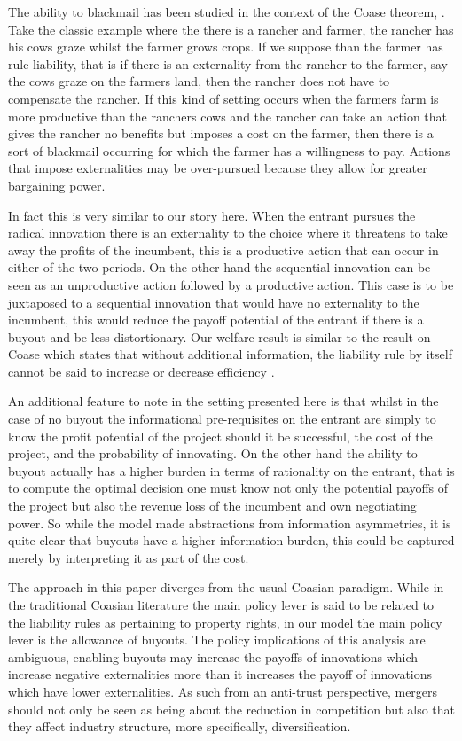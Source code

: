 \documentclass[11pt]{article}
\begin{document}
The ability to blackmail has been studied in the context of the Coase theorem, \cite{Dem}. Take the classic example where the there is a rancher and farmer, the rancher has his cows graze whilst the farmer grows crops. If we suppose than the farmer has rule liability, that is if there is an externality from the rancher to the farmer, say the cows graze on the farmers land, then the rancher does not have to compensate the rancher. If this kind of setting occurs when the farmers farm is more productive than the ranchers cows and the rancher can take an action that gives the rancher no benefits but imposes a cost on the farmer, then there is a sort of blackmail occurring for which the farmer has a willingness to pay. Actions that impose externalities may be over-pursued because they allow for greater bargaining power. 

In fact this is very similar to our story here. When the entrant pursues the radical innovation there is an externality to the choice where it threatens to take away the profits of the incumbent, this is a productive action that can occur in either of the two periods. On the other hand the sequential innovation can be seen as an unproductive action followed by a productive action. This case is to be juxtaposed to a sequential innovation that would have no externality to the incumbent, this would reduce the payoff potential of the entrant if there is a buyout and be less distortionary. Our welfare result is similar to the result on Coase which states that without additional information, the liability rule by itself cannot be said to increase or decrease efficiency \cite{Dem}. 

An additional feature to note in the setting presented here is that whilst in the case of no buyout the informational pre-requisites on the entrant are simply to know the profit potential of the project should it be successful, the cost of the project, and the probability of innovating. On the other hand the ability to buyout actually has a higher burden in terms of rationality on the entrant, that is to compute the optimal decision one must know not only the potential payoffs of the project but also the revenue loss of the incumbent and own negotiating power. So while the model made abstractions from information asymmetries, it is quite clear that buyouts have a higher information burden, this could be captured merely by interpreting it as part of the cost. 

The approach in this paper diverges from the usual Coasian paradigm. While in the traditional Coasian literature the main policy lever is said to be related to the liability rules as pertaining to property rights, in our model the main policy lever is the allowance of buyouts.  The policy implications of this analysis are ambiguous, enabling buyouts may increase the payoffs of innovations which increase negative externalities more than it increases the payoff of innovations which have lower externalities. As such from an anti-trust perspective, mergers should not only be seen as being about the reduction in competition but also that they affect industry structure, more specifically, diversification.  
\end{document}
